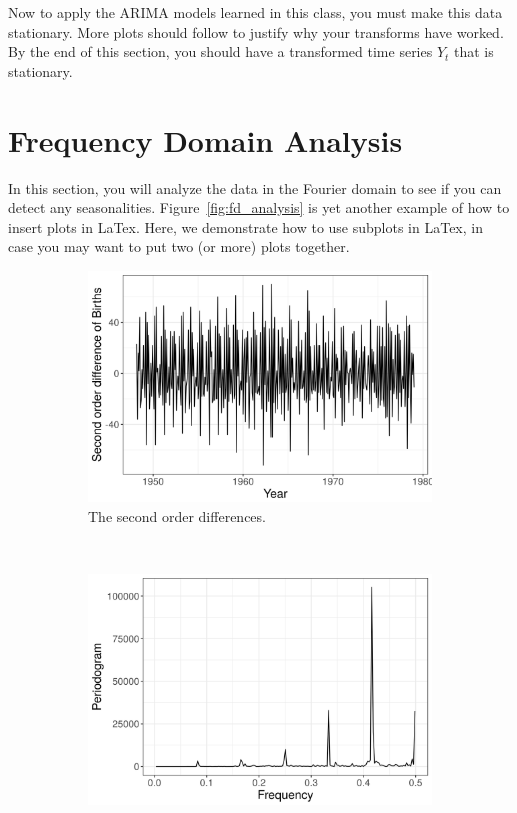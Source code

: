 \documentclass[a4paper]{article}
\begin{document}
Now to apply the ARIMA models learned in this class, you must make this data
stationary. More plots should follow to justify why your transforms have worked.
By the end of this section, you should have a transformed time series $Y_t$
that is stationary.

\section{Frequency Domain Analysis}\label{sec:FDA}
In this section, you will analyze the data in the Fourier domain to see if you
can detect any seasonalities. Figure~\ref{fig:fd_analysis} is yet another example of
how to insert plots
in LaTex. Here, we demonstrate how to use subplots in LaTex, in
case you may want to put two (or more) plots together.

\begin{figure}[h!]
    \centering
    \begin{subfigure}[b]{0.45\textwidth}
			\centering
        \includegraphics[width=\textwidth]{./figures/diff2_birth_data.png}
        \caption{The second order differences. }
        \label{fig:diff2_birth}
    \end{subfigure}
    ~ %
    \begin{subfigure}[b]{0.45\textwidth}
			\centering
        \includegraphics[width=\textwidth]{./figures/diff2_birth_pdg.png}

\end{subfigure}
\end{figure}
\end{document}
